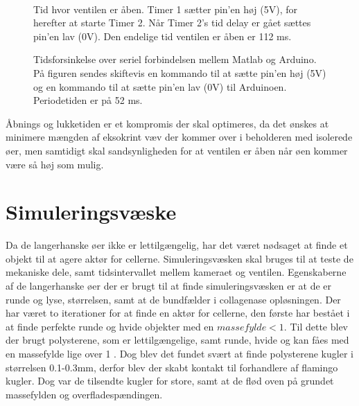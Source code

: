 \begin{figure}[H]
\begin{minipage}[b]{0.48\textwidth}
\end{minipage} \\ %
\begin{minipage}[t]{0.48\textwidth}
\caption{Tid hvor ventilen er åben. Timer 1 sætter pin'en høj (5V), for herefter at starte Timer 2. Når Timer 2's tid delay er gået sættes pin'en lav (0V). Den endelige tid ventilen er åben er 112 ms.} %
\label{fig:timerdelay}
\end{minipage} \hfill
\begin{minipage}[t]{0.48\textwidth}
\caption{Tidsforsinkelse over seriel forbindelsen mellem Matlab og Arduino. På figuren sendes skiftevis en kommando til at sætte pin'en høj (5V) og en kommando til at sætte pin'en lav (0V) til Arduinoen. Periodetiden er på 52 ms.} %
\label{fig:serielconn}
\end{minipage}
\end{figure}

 
Åbnings og lukketiden er et kompromis der skal optimeres, da det ønskes at minimere mængden af eksokrint væv der kommer over i beholderen med isolerede øer, men samtidigt skal sandsynligheden for at ventilen er åben når øen kommer være så høj som mulig.



\section{Simuleringsvæske}
\label{sec:simuleringsv}
Da de langerhanske øer ikke er lettilgængelig, har det været nødsaget at finde et objekt til at agere aktør for cellerne. Simuleringsvæsken skal bruges til at teste de mekaniske dele, samt tidsintervallet mellem kameraet og ventilen. Egenskaberne af de langerhanske øer der er brugt til at finde simuleringsvæsken er at de er runde og lyse, størrelsen, samt at de bundfælder i collagenase opløsningen. Der har været to iterationer for at finde en aktør for cellerne, den første har bestået i at finde perfekte runde og hvide objekter med en $massefylde<1$. Til dette blev der brugt polysterene, som er lettilgængelige, samt runde, hvide og kan fåes med en massefylde lige over 1 \citep{polybog}. Dog blev det fundet svært at finde polysterene kugler i størrelsen 0.1-0.3mm, derfor blev der skabt kontakt til forhandlere af flamingo kugler. Dog var de tilsendte kugler for store, samt at de flød oven på grundet massefylden og overfladespændingen. 

